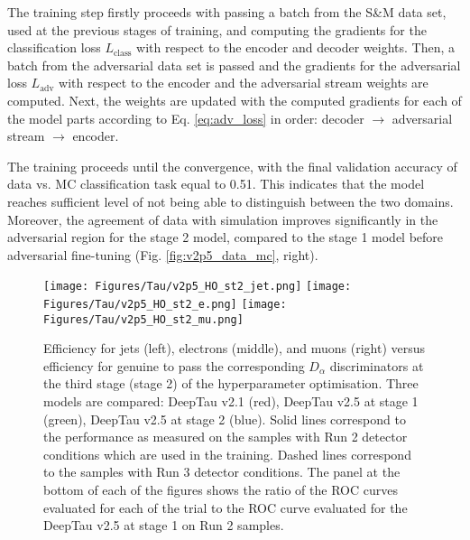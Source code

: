 The training step firstly proceeds with passing a batch from the S\&M data set, used at the previous stages of training, and computing the gradients for the classification loss $L_\text{class}$ with respect to the encoder and decoder weights. Then, a batch from the adversarial data set is passed and the gradients for the adversarial loss $L_\text{adv}$ with respect to the encoder and the adversarial stream weights are computed. Next, the weights are updated with the computed gradients for each of the model parts according to Eq. \ref{eq:adv_loss} in order: decoder $\to$ adversarial stream $\to$ encoder. 

The training proceeds until the convergence, with the final validation accuracy of data vs. MC classification task equal to 0.51. This indicates that the model reaches sufficient level of not being able to distinguish between the two domains. Moreover, the agreement of data with simulation improves significantly in the adversarial region for the stage 2 model, compared to the stage 1 model before adversarial fine-tuning (Fig. \ref{fig:v2p5_data_mc}, right). 

\begin{figure}[t!]
    \centering
    \texttt{[image: Figures/Tau/v2p5\_HO\_st2\_jet.png]}
    \texttt{[image: Figures/Tau/v2p5\_HO\_st2\_e.png]}
    \texttt{[image: Figures/Tau/v2p5\_HO\_st2\_mu.png]}
    \caption{Efficiency for jets (left), electrons (middle), and muons (right) versus efficiency for genuine \tauh to pass the corresponding $D_\alpha$ discriminators at the third stage (stage 2) of the hyperparameter optimisation. Three models are compared: DeepTau v2.1 (red), DeepTau v2.5 at stage 1 (green), DeepTau v2.5 at stage 2 (blue). Solid lines correspond to the performance as measured on the samples with Run 2 detector conditions which are used in the training. Dashed lines correspond to the samples with Run 3 detector conditions. The panel at the bottom of each of the figures shows the ratio of the ROC curves evaluated for each of the trial to the ROC curve evaluated for the DeepTau v2.5 at stage 1 on Run 2 samples.}
    \label{fig:v2p5_HO_stage2_performance}
\end{figure}

